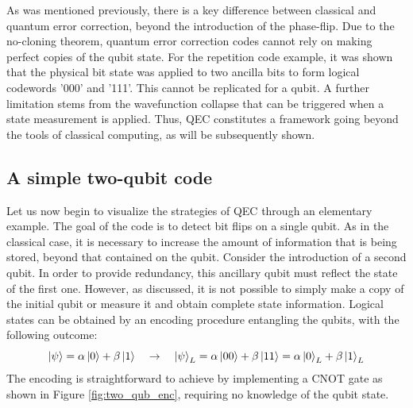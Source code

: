 As was mentioned previously, there is a key difference between classical and quantum error correction, beyond the introduction of the phase-flip. Due to the no-cloning theorem, quantum error correction codes cannot rely on making perfect copies of the qubit state. For the repetition code example, it was shown that the physical bit state was applied to two ancilla bits to form logical codewords '000' and '111'. This cannot be replicated for a qubit. A further limitation stems from the wavefunction collapse that can be triggered when a state measurement is applied. Thus, QEC constitutes a framework going beyond the tools of classical computing, as will be subsequently shown.

\subsection{A simple two-qubit code}

Let us now begin to visualize the strategies of QEC through an elementary example. The goal of the code is to detect bit flips on a single qubit. As in the classical case, it is necessary to increase the amount of information that is being stored, beyond that contained on the qubit. Consider the introduction of a second qubit. In order to provide redundancy, this ancillary qubit must reflect the state of the first one. However, as discussed, it is not possible to simply make a copy of the initial qubit or measure it and obtain complete state information. Logical states can be obtained by an encoding procedure entangling the qubits, with the following outcome:
\begin{equation}
    \ket{\psi}= \alpha \ket{0} +\beta \ket{1} \quad \rightarrow \quad \ket{\psi}_L = \alpha \ket{00} +\beta \ket{11}=\alpha \ket{0}_L +\beta \ket{1}_L
\end{equation}
The encoding is straightforward to achieve by implementing a CNOT gate as shown in Figure \ref{fig:two_qub_enc}, requiring no knowledge of the qubit state.

